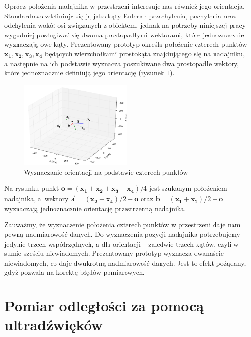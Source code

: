 Oprócz położenia nadajnika w przestrzeni interesuje nas również jego orientacja.
Standardowo zdefiniuje się ją jako kąty Eulera \cite{bib:katyEulera}: przechylenia, 
pochylenia oraz odchylenia wokół osi związanych z obiektem, jednak na potrzeby niniejszej pracy wygodniej 
posługiwać się dwoma prostopadłymi wektorami, które jednoznacznie wyznaczają owe kąty. 
Prezentowany prototyp określa położenie czterech punktów $\boldsymbol{x_1, x_2, x_3, x_4}$ będących wierzchołkami prostokąta 
znajdującego się na nadajniku, a następnie na ich podstawie wyznacza poszukiwane dwa prostopadłe wektory, które jednoznacznie
definiują jego orientację (rysunek \ref{fig:orientacja}).
 \begin{figure}[H]
    \centering
    \includegraphics[width=0.5\textwidth, trim= 0mm 0mm 0mm 0mm,clip]{orientacja}
    \caption{Wyznaczanie orientacji na podstawie czterech punktów}
    \label{fig:orientacja}
\end{figure}
Na rysunku punkt $\boldsymbol{o} = (\boldsymbol{x_1} + \boldsymbol{x_2} + \boldsymbol{x_3} + \boldsymbol{x_4})/4$ jest szukanym położeniem
nadajnika, a~wektory $\boldsymbol{\overrightarrow{a}} = (\boldsymbol{x_2} + \boldsymbol{x_4})/2 - \boldsymbol{o}$ oraz 
$\boldsymbol{\overrightarrow{b}} = (\boldsymbol{x_1} + \boldsymbol{x_2})/2 - \boldsymbol{o}$ wyznaczają jednoznacznie
orientację przestrzenną nadajnika.

Zauważmy, że wyznaczenie położenia czterech punktów w przestrzeni daje nam pewną nadmiarowość
danych. Do wyznaczenia pozycji nadajnika potrzebujemy jedynie trzech współrzędnych,
a dla orientacji -- zaledwie trzech kątów, czyli w sumie sześciu niewiadomych.
Prezentowany prototyp wyznacza  dwanaście niewiadomych, co daje dwukrotną nadmiarowość danych.
Jest to efekt pożądany, gdyż pozwala na korektę błędów pomiarowych.


\section{Pomiar odległości za pomocą ultradźwięków}


